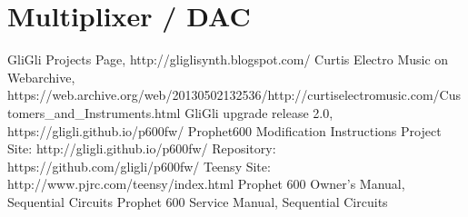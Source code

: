 \documentclass[draft,landscape, 11pt, oneside]{report}
\begin{document}
\section{Multiplixer / DAC}\label{potmux}


\begin{thebibliography}{50} 

GliGli Projects Page, http://gliglisynth.blogspot.com/
Curtis Electro Music on Webarchive, https://web.archive.org/web/20130502132536/http://curtiselectromusic.com/Customers\_and\_Instruments.html
GliGli upgrade release 2.0,  https://gligli.github.io/p600fw/
 Prophet600 Modification Instructions
 Project Site: http://gligli.github.io/p600fw/
 Repository: https://github.com/gligli/p600fw/
Teensy Site: http://www.pjrc.com/teensy/index.html
Prophet 600 Owner's Manual, Sequential Circuits
 Prophet 600 Service Manual, Sequential Circuits

\end{thebibliography}
\end{document}
